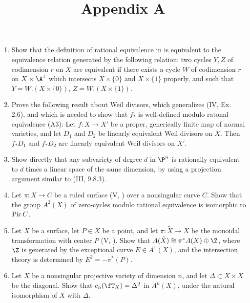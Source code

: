 \documentclass[a4paper]{article}
\title{Appendix A}
\begin{document}
\maketitle

\begin{enumerate} [label=\textbf{\arabic*.}, leftmargin=0em]

      \item Show that the definition of rational equivalence in  is equivalent to the equivalence relation generated by the following relation: two cycles $Y, Z$ of codimension $r$ on $X$ are equivalent if there exists a cycle $W$ of codimension $r$ on $X \times \A^1$ which intersects $X \times \{ 0 \}$ and $X \times \{ 1 \}$ properly, and such that $Y = W.(X \times \{ 0 \})$, $Z = W.(X \times \{ 1 \})$.

      \item Prove the following result about Weil divisors, which generalizes (IV, Ex. 2.6), and which is needed to show that $f_*$ is well-defined modulo ratonal equivalence (A3): Let $f : X \to X'$ be a proper, generically finite map of normal varieties, and let $D_1$ and $D_2$ be linearly equivalent Weil divisors on $X$.
      Then $f_* D_1$ and $f_* D_2$ are linearly equivalent Weil divisors on $X'$.

      \item Show directly that any subvariety of degree $d$ in $\P^n$ is rationally equivalent to $d$ times a linear space of the same dimension, by using a projection argument similar to (III, 9.8.3).

      \item Let $\pi : X \to C$ be a ruled surface (V, ) over a nonsingular curve $C$.
      Show that the group $A^2(X)$ of zero-cycles modulo rational equivalence is isomorphic to $\operatorname{Pic}{C}$.

      \item Let $X$ be a surface, let $P \in X$ be a point, and let $\pi : \tilde{X} \to X$ be the monoidal transformation with center $P$ (V, ).
      Show that $A(\tilde{X}) \cong \pi^* A(X) \oplus \Z$, where $\Z$ is generated by the exceptional curve $E \in A^1(X)$, and the intersection theory is determined by $E^2 = -\pi^*(P)$.

      \item Let $X$ be a nonsingular projective variety of dimension $n$, and let $\Delta \subset X \times X$ be the diagonal.
      Show that $c_n(\fT_X) = \Delta^2$ in $A^n(X)$, under the natural isomorphism of $X$ with $\Delta$.


\end{enumerate}
\end{document}
